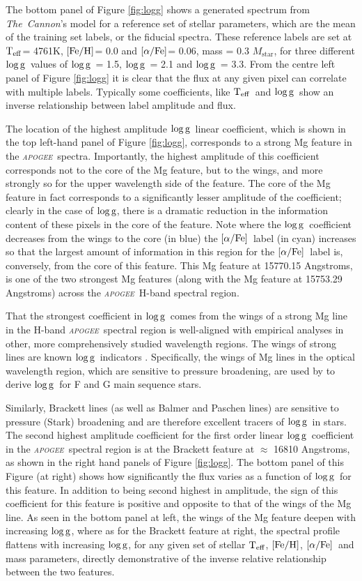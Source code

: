\documentclass[12pt, preprint]{aastex}
\newcommand{\project}[1]{\textsl{#1}}
\newcommand{\tc}{\project{The~Cannon}}
\newcommand{\apogee}{\project{\textsc{apogee}}}
\newcommand{\teff}{\mbox{$\rm T_{eff}$}}
\newcommand{\feh}{\mbox{$\rm [Fe/H]$}}
\newcommand{\alphafe}{\mbox{$\rm [\alpha/Fe]$}}
\newcommand{\logg}{\mbox{$\rm \log g$}}
\begin{document}
The bottom panel of Figure  \ref{fig:logg} shows a generated spectrum from \tc's model for a reference set of stellar parameters, which are the mean of the training set labels, or the fiducial spectra. These reference labels are set at \teff = 4761K, \feh = 0.0 and \alphafe = 0.06, mass = 0.3 $M_{\mbox{star}}$, for three different \logg\ values of \logg\ = 1.5, \logg\ = 2.1 and \logg\ = 3.3. From the centre left panel of Figure \ref{fig:logg} it is clear that the flux at any given pixel can correlate with multiple labels. Typically some coefficients, like \teff\ and \logg\ show an inverse relationship between label amplitude and flux.

The location of the highest amplitude \logg\ linear coefficient, which is shown in the top left-hand panel of Figure \ref{fig:logg}, corresponds to a strong  Mg feature in the \apogee\ spectra. Importantly, the highest amplitude of this coefficient corresponds not to the core of the Mg feature, but to the wings, and more strongly so for the upper wavelength side of the feature. The core of the Mg feature in fact  corresponds to a significantly lesser amplitude of  the coefficient; clearly in the case of \logg,  there is a dramatic reduction in the information content of these pixels in the core of the feature. Note where the \logg\ coefficient decreases from the wings to the core (in blue) the \alphafe\ label (in cyan) increases so that the largest amount of information in this region for the \alphafe\ label is, conversely, from the core of this feature. This Mg feature at 15770.15 Angstroms, is one of the two strongest Mg features (along with the Mg feature at 15753.29 Angstroms) across the \apogee\ H-band spectral region. 

That the strongest coefficient in \logg\ comes from the wings of a strong Mg line in the H-band \apogee\ spectral region is well-aligned with empirical analyses in other, more comprehensively studied wavelength regions. The wings of strong lines are known \logg\ indicators \citep{Gray2008}. Specifically, the wings of Mg lines in the optical wavelength region, which are sensitive to pressure broadening, are used by \citet{F1997} to derive \logg\ for F and G main sequence stars.  

Similarly, Brackett lines (as well as Balmer and Paschen lines)  are sensitive to pressure (Stark) broadening and are therefore excellent tracers of \logg\ in stars. The second highest amplitude coefficient for the first order linear \logg\ coefficient in the \apogee\ spectral region is at the Brackett feature  at $\approx$ 16810 Angstroms, as shown in the right hand panels of Figure \ref{fig:logg}. The  bottom panel of this Figure (at right) shows how significantly the flux varies as a function of \logg\ for this feature. In addition to being second highest in amplitude, the sign of this coefficient for this feature is positive and opposite to that  of the wings of the Mg line. As seen in the bottom panel at left, the wings of the Mg feature deepen with increasing \logg, where as for the Brackett feature at right, the spectral profile flattens with increasing \logg, for any given set of stellar \teff, \feh, \alphafe\ and mass parameters, directly demonstrative of the inverse relative relationship between the two features. 
\end{document}
